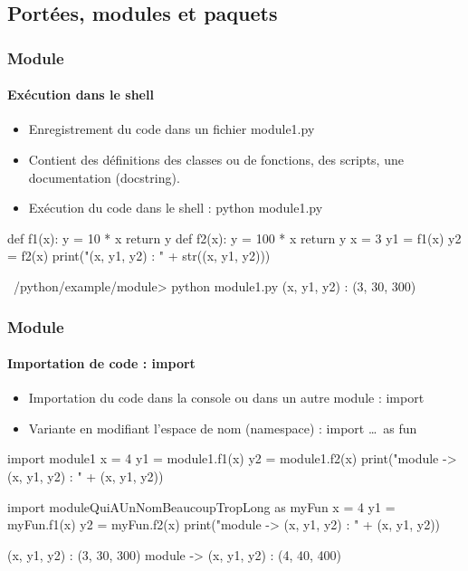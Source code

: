 \subsection{Portées, modules et paquets}
\begin{frame}[fragile]
\frametitle{Module}
\framesubtitle{Exécution dans le shell}
\begin{itemize}
\item Enregistrement du code dans un fichier module1.py
\item Contient des définitions des classes ou de fonctions, des scripts, une documentation (docstring).  
\item Exécution du code dans le shell : python module1.py
\end{itemize}
\begin{python}
def f1(x):
    y = 10 * x
    return y
def f2(x):
    y = 100 * x
    return y
x = 3
y1 = f1(x)
y2 = f2(x)
print("(x, y1, y2) : " + str((x, y1, y2)))
\end{python}

\begin{shell}
~/python/example/module> python module1.py
(x, y1, y2) : (3, 30, 300)
\end{shell}
\end{frame}
\begin{frame}[fragile]
\frametitle{Module}
\framesubtitle{Importation de code : import}
\begin{itemize}
\item Importation du code dans la console ou dans un autre module : import  
\item Variante en modifiant l'espace de nom (namespace) : import \dots\ as fun
\end{itemize}
\begin{python}
import module1
x = 4
y1 = module1.f1(x)
y2 = module1.f2(x)
print("module -> (x, y1, y2) : " + (x, y1, y2))
\end{python}
\begin{python}
import moduleQuiAUnNomBeaucoupTropLong as myFun
x = 4
y1 = myFun.f1(x)
y2 = myFun.f2(x)
print("module -> (x, y1, y2) : " + (x, y1, y2))
\end{python}
\begin{shell}
(x, y1, y2) : (3, 30, 300)
module -> (x, y1, y2) : (4, 40, 400)
\end{shell}
\end{frame}

